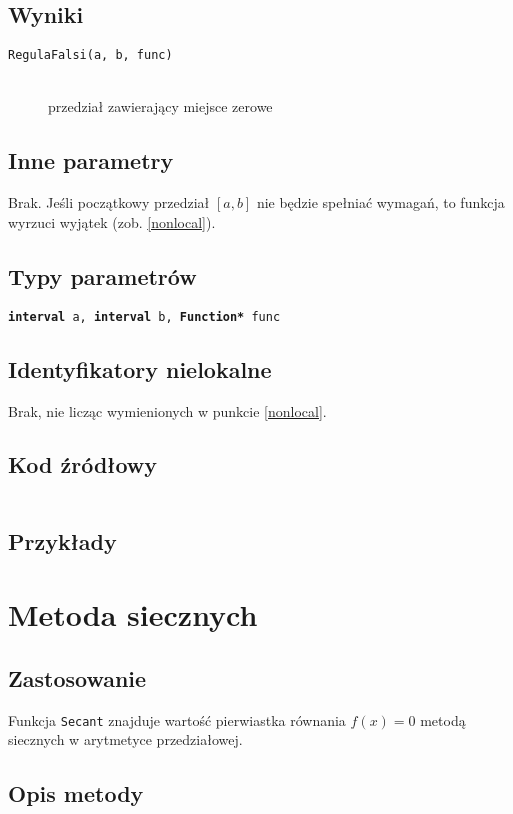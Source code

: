 \documentclass[12pt]{article}
\begin{document}
		\subsection{Wyniki}
			\begin{description}
				\item[\texttt{RegulaFalsi(a, b, func)}] \hfill\\
					przedział zawierający miejsce zerowe
			\end{description}

		\subsection{Inne parametry}
			Brak. Jeśli początkowy przedział $[a, b]$ nie będzie spełniać wymagań, to funkcja wyrzuci wyjątek (zob. \ref{nonlocal}).

		\subsection{Typy parametrów}
			\texttt{\textbf{interval} a, \textbf{interval} b, \textbf{Function*} func}

		\subsection{Identyfikatory nielokalne}
      Brak, nie licząc wymienionych w punkcie \ref{nonlocal}.

		\subsection{Kod źródłowy}
			\inputminted[firstline=3, lastline=34]{c++}{../solvers/regulafalsi.cpp}


		\subsection{Przykłady}

	\section{Metoda siecznych}
		\subsection{Zastosowanie}
    Funkcja \texttt{Secant} znajduje wartość pierwiastka równania
    $f(x) = 0$ metodą siecznych w arytmetyce przedziałowej.

		\subsection{Opis metody}
\end{document}
